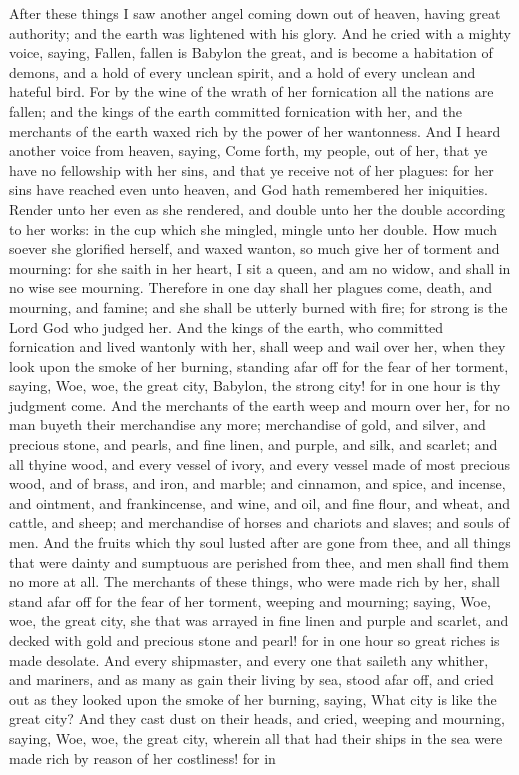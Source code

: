 After these things I saw another angel coming down out of heaven, having great authority; and the earth was lightened with his glory. And he cried with a mighty voice, saying, Fallen, fallen is Babylon the great, and is become a habitation of demons, and a hold of every unclean spirit, and a hold of every unclean and hateful bird. For by the wine of the wrath of her fornication all the nations are fallen; and the kings of the earth committed fornication with her, and the merchants of the earth waxed rich by the power of her wantonness.  And I heard another voice from heaven, saying, Come forth, my people, out of her, that ye have no fellowship with her sins, and that ye receive not of her plagues: for her sins have reached even unto heaven, and God hath remembered her iniquities. Render unto her even as she rendered, and double unto her the double according to her works: in the cup which she mingled, mingle unto her double. How much soever she glorified herself, and waxed wanton, so much give her of torment and mourning: for she saith in her heart, I sit a queen, and am no widow, and shall in no wise see mourning. Therefore in one day shall her plagues come, death, and mourning, and famine; and she shall be utterly burned with fire; for strong is the Lord God who judged her. And the kings of the earth, who committed fornication and lived wantonly with her, shall weep and wail over her, when they look upon the smoke of her burning, standing afar off for the fear of her torment, saying, Woe, woe, the great city, Babylon, the strong city! for in one hour is thy judgment come. And the merchants of the earth weep and mourn over her, for no man buyeth their merchandise any more; merchandise of gold, and silver, and precious stone, and pearls, and fine linen, and purple, and silk, and scarlet; and all thyine wood, and every vessel of ivory, and every vessel made of most precious wood, and of brass, and iron, and marble; and cinnamon, and spice, and incense, and ointment, and frankincense, and wine, and oil, and fine flour, and wheat, and cattle, and sheep; and merchandise of horses and chariots and slaves; and souls of men. And the fruits which thy soul lusted after are gone from thee, and all things that were dainty and sumptuous are perished from thee, and men shall find them no more at all. The merchants of these things, who were made rich by her, shall stand afar off for the fear of her torment, weeping and mourning; saying, Woe, woe, the great city, she that was arrayed in fine linen and purple and scarlet, and decked with gold and precious stone and pearl! for in one hour so great riches is made desolate. And every shipmaster, and every one that saileth any whither, and mariners, and as many as gain their living by sea, stood afar off, and cried out as they looked upon the smoke of her burning, saying, What city is like the great city? And they cast dust on their heads, and cried, weeping and mourning, saying, Woe, woe, the great city, wherein all that had their ships in the sea were made rich by reason of her costliness! for in 